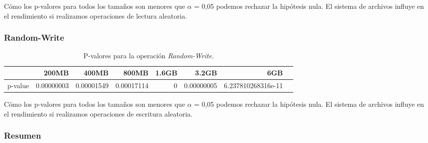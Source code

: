 Cómo los p-valores para todos los tamaños son menores que $\alpha$ = 0,05 podemos rechazar la hipótesis nula. El sistema de archivos influye en el rendimiento si realizamos operaciones de lectura aleatoria. 

\subsubsection{Random-Write}
\begin{table}[!htp]\centering
\scriptsize
\begin{tabular}{lrrrrrrr}\toprule
&200MB &400MB &800MB &1.6GB &3.2GB &6GB \\\midrule
p-value &0.00000003 &0.00001549 &0.00017114 &0 &0.00000005 &6.237810268316e-11 \\
\bottomrule
\end{tabular}
\caption{P-valores para la operación \textit{Random-Write}.}\label{tab: }
\end{table}

Cómo los p-valores para todos los tamaños son menores que $\alpha$ = 0,05 podemos rechazar la hipótesis nula. El sistema de archivos influye en el rendimiento si realizamos operaciones de escritura aleatoria.

\newpage
\subsubsection{Resumen}

